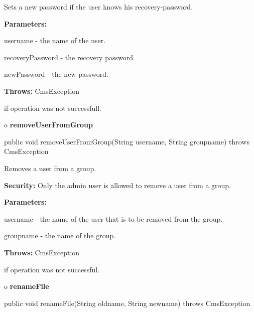 \begin{description}
\htmlDD Sets a new password if the user knows his recovery-password. 

\begin{description}
\item {\bf Parameters:}  

username - the name of the user.  

recoveryPassword - the recovery password.  

newPassword - the new password.  
\item {\bf Throws:} CmsException  

if operation was not successfull.  
\end{description}

\end{description}

o {\bf removeUserFromGroup} 

\begin{PRE}
 public void removeUserFromGroup(String username,
                                 String groupname) throws CmsException
\end{PRE}

\begin{description}
\htmlDD Removes a user from a group. 

{\bf Security:} Only the admin user is allowed to remove a user from a group. 

\begin{description}
\item {\bf Parameters:}  

username - the name of the user that is to be removed from the group.  

groupname - the name of the group.  
\item {\bf Throws:} CmsException  

if operation was not successful.  
\end{description}

\end{description}

o {\bf renameFile} 

\begin{PRE}
 public void renameFile(String oldname,
                        String newname) throws CmsException
\end{PRE}

